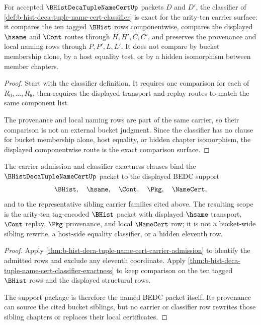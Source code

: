 \begin{theorem}
\label{thm:b-hist-deca-tuple-name-cert-classifier-exactness}
For accepted $\BHistDecaTupleNameCertUp$ packets $D$ and $D'$, the classifier of \autoref{def:b-hist-deca-tuple-name-cert-classifier} is exact for the arity-ten carrier surface: it compares the ten tagged $\BHist$ rows componentwise, compares the displayed $\hsame$ and $\Cont$ routes through $H,H',C,C'$, and preserves the provenance and local naming rows through $P,P',L,L'$. It does not compare by bucket membership alone, by a host equality test, or by a hidden isomorphism between member chapters.
\end{theorem}
\begin{proof}
Start with the classifier definition. It requires one comparison for each of $R_0,\ldots,R_9$, then requires the displayed transport and replay routes to match the same component list.

The provenance and local naming rows are part of the same carrier, so their comparison is not an external bucket judgment. Since the classifier has no clause for bucket membership alone, host equality, or hidden chapter isomorphism, the displayed componentwise route is the exact comparison surface.
\end{proof}

\begin{theorem}
\label{thm:b-hist-deca-tuple-name-cert-scoped-support-package}
The carrier admission and classifier exactness clauses bind the $\BHistDecaTupleNameCertUp$ packet to the displayed BEDC support
$$
\BHist,\quad \hsame,\quad \Cont,\quad \Pkg,\quad \NameCert,
$$
and to the representative sibling carrier families cited above. The resulting scope is the arity-ten tag-encoded $\BHist$ packet with displayed $\hsame$ transport, $\Cont$ replay, $\Pkg$ provenance, and local $\NameCert$ row; it is not a bucket-wide sibling rewrite, a host-side equality classifier, or a hidden eleventh row.
\end{theorem}
\begin{proof}
Apply \autoref{thm:b-hist-deca-tuple-name-cert-carrier-admission} to identify the admitted rows and exclude any eleventh coordinate. Apply \autoref{thm:b-hist-deca-tuple-name-cert-classifier-exactness} to keep comparison on the ten tagged $\BHist$ rows and the displayed structural rows.

The support package is therefore the named BEDC packet itself. Its provenance can source the cited bucket siblings, but no carrier or classifier row rewrites those sibling chapters or replaces their local certificates.
\end{proof}

